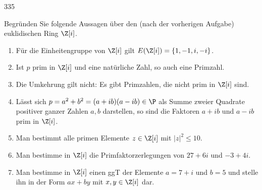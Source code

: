 \begin{algebraUE}{335}

Begründen Sie folgende Aussagen über den (nach der vorherigen Aufgabe) euklidischen Ring $\Z [i]$.

\begin{enumerate}
  \item Für die Einheitengruppe von $\Z [i]$ gilt $E(\Z [i]) = \{1,-1,i,-i\}$.

  \item Ist $p$ prim in $\Z [i]$ und eine natürliche Zahl, so auch eine Primzahl.

  \item Die Umkehrung gilt nicht: Es gibt Primzahlen, die nicht prim in $\Z [i]$ sind.

  \item Lässt sich $p = a^2 + b^2 = (a+ib)(a-ib) \in \P$ als Summe zweier Quadrate positiver ganzer Zahlen $a,b$ darstellen, so sind die Faktoren $a+ib$ und $a-ib$ prim in $\Z [i]$.

  \item Man bestimmt alle primen Elemente $z \in \Z[i]$ mit $|z|^2 \leq 10$.

  \item Man bestimme in $\Z [i]$ die Primfaktorzerlegungen von $27+6i$ und $-3+4i$.

  \item Man bestimme in $\Z [i]$ einen ggT der Elemente $a = 7+i$ und $b=5$ und stelle ihn in der Form $ax + by$ mit $x,y \in \Z [i]$ dar.

\end{enumerate}

\end{algebraUE}

